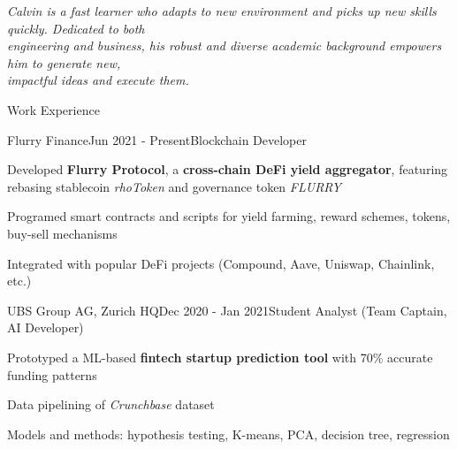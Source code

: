 \documentclass{resume}
\begin{document}
\emph{Calvin is a fast learner who adapts to new environment and picks up new skills quickly. Dedicated to both}
\\\emph{engineering and business, his robust and diverse academic background
empowers him to generate new,}
\\\emph{impactful ideas and execute them.}

\begin{rSection}{Work Experience}
    
    \begin{rSubsection}{Flurry Finance}{Jun 2021 - Present}{Blockchain Developer}{}
        \item Developed \textbf{Flurry Protocol}, a \textbf{cross-chain DeFi yield aggregator},
        featuring rebasing stablecoin \emph{rhoToken} and governance token \emph{FLURRY}
        \item Programed smart contracts and scripts for yield farming, reward schemes, tokens, buy-sell mechanisms
        \item Integrated with popular DeFi projects (Compound, Aave, Uniswap, Chainlink, etc.)
    \end{rSubsection}
    
    \begin{rSubsection}{UBS Group AG, Zurich HQ}{Dec 2020 - Jan 2021}{Student Analyst (Team Captain, AI Developer)}{}
        \item Prototyped a ML-based \textbf{fintech startup prediction tool} with 70\% accurate funding patterns
        \item Data pipelining of \emph{Crunchbase} dataset
        \item Models and methods: hypothesis testing, K-means, PCA, decision tree, regression
    \end{rSubsection}
    
\end{rSection}
\end{document}
